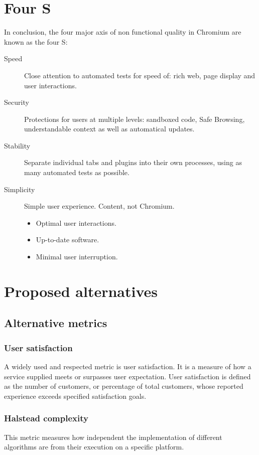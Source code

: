 \section{Four S}

In conclusion, the four major axis of non functional quality in Chromium are known as the four S:
\begin{description}
\item[Speed] Close attention to automated tests for speed of: rich web, page display and user interactions. 
\item[Security] Protections for users at multiple levels: sandboxed code, Safe Browsing, understandable context as well as automatical updates.
\item[Stability] Separate individual tabs and plugins into their own processes, using as many automated tests as possible.
\item[Simplicity] Simple user experience. Content, not Chromium.
    \begin{itemize}
        \item Optimal user interactions.
        \item Up-to-date software.
        \item Minimal user interruption.
    \end{itemize}
\end{description}


\section{Proposed alternatives}

\subsection{Alternative metrics}

\subsubsection{User satisfaction}
A widely used and respected metric is user satisfaction. It is a measure of how a service supplied meets or surpasses user expectation. User satisfaction is defined as the number of customers, or percentage of total customers, whose reported experience exceeds specified satisfaction goals.

\subsubsection{Halstead complexity}
This metric measures how independent the implementation of different algorithms are from their execution on a specific platform.

